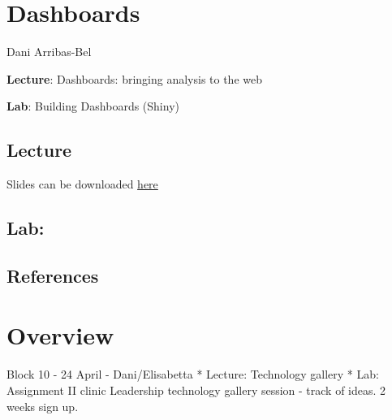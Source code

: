 \documentclass[
  letterpaper,
  DIV=11,
  numbers=noendperiod]{scrreprt}
\begin{document}

\hypertarget{dashboards}{%
\chapter{Dashboards}\label{dashboards}}

Dani Arribas-Bel

\textbf{Lecture}: Dashboards: bringing analysis to the web

\textbf{Lab}: Building Dashboards (Shiny)

\hypertarget{lecture-7}{%
\section{Lecture}\label{lecture-7}}

Slides can be downloaded
\href{https://github.com/GDSL-UL/wma/raw/main/pdf/lecture_08.pdf}{here}

\hypertarget{lab-2}{%
\section{Lab:}\label{lab-2}}

\hypertarget{references-7}{%
\section{References}\label{references-7}}


\hypertarget{overview-1}{%
\chapter{Overview}\label{overview-1}}

Block 10 - 24 April - Dani/Elisabetta * Lecture: Technology gallery *
Lab: Assignment II clinic Leadership technology gallery session - track
of ideas. 2 weeks sign up.
\end{document}
